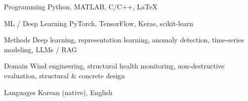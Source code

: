 

\begin{cvskills}

  \cvskill
    {Programming} %
    {Python, MATLAB, C/C++, LaTeX} %

  \cvskill
    {ML / Deep Learning} %
    {PyTorch, TensorFlow, Keras, scikit-learn} %

  \cvskill
    {Methods} %
    {Deep learning, representation learning, anomaly detection, time-series modeling, LLMs / RAG} %

  \cvskill
    {Domain} %
    {Wind engineering, structural health monitoring, non-destructive evaluation, structural \& concrete design} %

  \cvskill
    {Languages} %
    {Korean (native), English} %

\end{cvskills}
